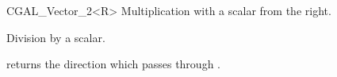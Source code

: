 \begin {classtemplate} {CGAL_Vector_2<R>}
       {Multiplication with a scalar from the right.}



       {Division by a scalar.}

       {returns the direction which passes through \var.}



\end {classtemplate} 

%
%
